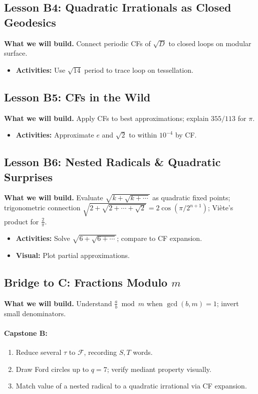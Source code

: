 \documentclass[11pt]{article}
\begin{document}
\subsection*{Lesson B4: Quadratic Irrationals as Closed Geodesics}
\textbf{What we will build.} Connect periodic CFs of $\sqrt{D}$ to closed loops on modular surface.
\begin{itemize}
\item \textbf{Activities:} Use $\sqrt{14}$ period to trace loop on tessellation.
\end{itemize}

\subsection*{Lesson B5: CFs in the Wild}
\textbf{What we will build.} Apply CFs to best approximations; explain $355/113$ for $\pi$.
\begin{itemize}
\item \textbf{Activities:} Approximate $e$ and $\sqrt{2}$ to within $10^{-4}$ by CF.
\end{itemize}

\subsection*{Lesson B6: Nested Radicals \& Quadratic Surprises}
\textbf{What we will build.} Evaluate $\sqrt{k+\sqrt{k+\cdots}}$ as quadratic fixed points; trigonometric connection $\sqrt{2+\sqrt{2+\cdots+\sqrt{2}}}=2\cos(\pi/2^{n+1})$; Viète’s product for $\frac{2}{\pi}$.
\begin{itemize}
\item \textbf{Activities:} Solve $\sqrt{6+\sqrt{6+\cdots}}$; compare to CF expansion.
\item \textbf{Visual:} Plot partial approximations.
\end{itemize}

\subsection*{Bridge to C: Fractions Modulo $m$}
\textbf{What we will build.} Understand $\frac{a}{b}\bmod m$ when $\gcd(b,m)=1$; invert small denominators.

\paragraph{Capstone B:}
\begin{enumerate}
\item Reduce several $\tau$ to $\mathcal{F}$, recording $S,T$ words.
\item Draw Ford circles up to $q=7$; verify mediant property visually.
\item Match value of a nested radical to a quadratic irrational via CF expansion.
\end{enumerate}
\end{document}
